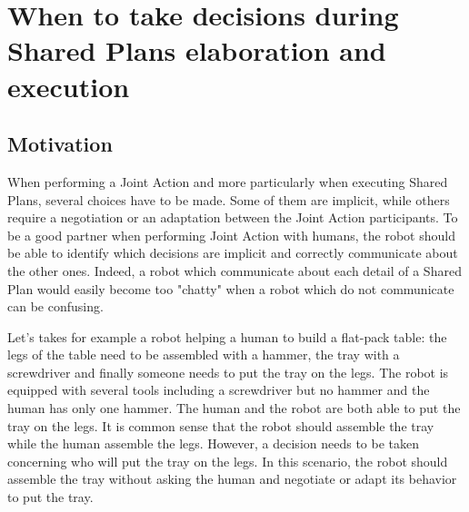 \documentclass[english,a4paper,11pt,twoside]{StyleThese}
\begin{document}
\setcounter{chapter}{3} %
\dominitoc
\faketableofcontents
\fi

\chapter{When to take decisions during Shared Plans elaboration and execution}
\minitoc

\label{ch:SP}

\section{Motivation}

When performing a Joint Action and more particularly when executing Shared Plans, several choices have to be made. Some of them are implicit, while others require a negotiation or an adaptation between the Joint Action participants. To be a good partner when performing Joint Action with humans, the robot should be able to identify which decisions are implicit and correctly communicate about the other ones. Indeed, a robot which communicate about each detail of a Shared Plan would easily become too "chatty" when a robot which do not communicate can be confusing.

Let's takes for example a robot helping a human to build a flat-pack table: the legs of the table need to be assembled with a hammer, the tray with a screwdriver and finally someone needs to put the tray on the legs. The robot is equipped with several tools including a screwdriver but no hammer and the human has only one hammer. The human and the robot are both able to put the tray on the legs. It is common sense that the robot should assemble the tray while the human assemble the legs. However, a decision needs to be taken concerning who will put the tray on the legs. 
In this scenario, the robot should assemble the tray without asking the human and negotiate or adapt its behavior to put the tray. 
\end{document}
